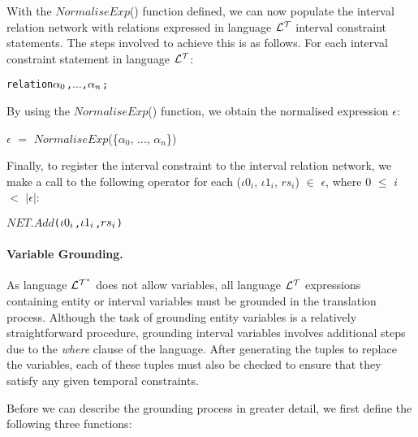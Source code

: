 \documentclass[11pt]{report}
\newenvironment{vverbatim}
{
  \begin{alltt}
}
{
    \vspace{-\baselineskip}
  \end{alltt}
}
\newenvironment{vquote}
{
  \begin{list}{}{\leftmargin 1em}\item[]
}
{
  \end{list}
}
\begin{document}
            With the $NormaliseExp$() function defined, we can now populate the
            interval relation network with relations expressed in language
            ${\cal L^T}$ interval constraint statements. The steps involved
            to achieve this is as follows. For each interval constraint
            statement in language ${\cal L^T}$:

            \begin{vverbatim}
  relation \(\alpha\sb{0}\), \(\ldots\), \(\alpha\sb{n}\);
            \end{vverbatim}

            \noindent
            By using the $NormaliseExp$() function, we obtain the normalised
            expression $\epsilon$:

            \begin{vquote}
              $\epsilon$ $=$
                $NormaliseExp$(\{${\alpha}_0$, $\ldots$, ${\alpha}_n$\})
            \end{vquote}

            \noindent
            Finally, to register the interval constraint to the interval
            relation network, we make a call to the following operator
            for each (${\iota}0_i$, ${\iota}1_i$, $rs_i$) $\in$
            $\epsilon$, where $0$ $\leq$ $i$ $<$ $|\epsilon|$:

            \begin{vverbatim}
  \(NET.Add\)(\({\iota}0\sb{i}\), \({\iota}1\sb{i}\), \(rs\sb{i}\))
            \end{vverbatim}

          \paragraph
            {\bf Variable Grounding.}

            As language ${\cal L^{T^*}}$ does not allow variables, all
	    language ${\cal L^T}$ expressions containing entity or interval
            variables must be grounded in the translation process. Although
            the task of grounding entity variables is a relatively
            straightforward procedure, grounding interval variables involves
            additional steps due to the {\em where} clause of the language.
            After generating the tuples to replace the variables, each of
            these tuples must also be checked to ensure that they satisfy
            any given temporal constraints.

            Before we can describe the grounding process in greater detail,
            we first define the following three functions:
\end{document}
